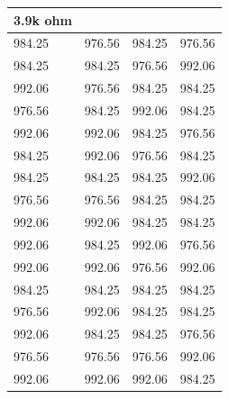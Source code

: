 	\begin{table}[]
		\centering
		\begin{tabular}{|llll|}
			\hline
			3.9k ohm                     &                             &                             &        \\ \hline
			\multicolumn{1}{|l|}{984.25} & \multicolumn{1}{l|}{976.56} & \multicolumn{1}{l|}{984.25} & 976.56 \\ \hline
			\multicolumn{1}{|l|}{984.25} & \multicolumn{1}{l|}{984.25} & \multicolumn{1}{l|}{976.56} & 992.06 \\ \hline
			\multicolumn{1}{|l|}{992.06} & \multicolumn{1}{l|}{976.56} & \multicolumn{1}{l|}{984.25} & 984.25 \\ \hline
			\multicolumn{1}{|l|}{976.56} & \multicolumn{1}{l|}{984.25} & \multicolumn{1}{l|}{992.06} & 984.25 \\ \hline
			\multicolumn{1}{|l|}{992.06} & \multicolumn{1}{l|}{992.06} & \multicolumn{1}{l|}{984.25} & 976.56 \\ \hline
			\multicolumn{1}{|l|}{984.25} & \multicolumn{1}{l|}{992.06} & \multicolumn{1}{l|}{976.56} & 984.25 \\ \hline
			\multicolumn{1}{|l|}{984.25} & \multicolumn{1}{l|}{984.25} & \multicolumn{1}{l|}{984.25} & 992.06 \\ \hline
			\multicolumn{1}{|l|}{976.56} & \multicolumn{1}{l|}{976.56} & \multicolumn{1}{l|}{984.25} & 984.25 \\ \hline
			\multicolumn{1}{|l|}{992.06} & \multicolumn{1}{l|}{992.06} & \multicolumn{1}{l|}{984.25} & 984.25 \\ \hline
			\multicolumn{1}{|l|}{992.06} & \multicolumn{1}{l|}{984.25} & \multicolumn{1}{l|}{992.06} & 976.56 \\ \hline
			\multicolumn{1}{|l|}{992.06} & \multicolumn{1}{l|}{992.06} & \multicolumn{1}{l|}{976.56} & 992.06 \\ \hline
			\multicolumn{1}{|l|}{984.25} & \multicolumn{1}{l|}{984.25} & \multicolumn{1}{l|}{984.25} & 984.25 \\ \hline
			\multicolumn{1}{|l|}{976.56} & \multicolumn{1}{l|}{992.06} & \multicolumn{1}{l|}{984.25} & 984.25 \\ \hline
			\multicolumn{1}{|l|}{992.06} & \multicolumn{1}{l|}{984.25} & \multicolumn{1}{l|}{984.25} & 976.56 \\ \hline
			\multicolumn{1}{|l|}{976.56} & \multicolumn{1}{l|}{976.56} & \multicolumn{1}{l|}{976.56} & 992.06 \\ \hline
			\multicolumn{1}{|l|}{992.06} & \multicolumn{1}{l|}{992.06} & \multicolumn{1}{l|}{992.06} & 984.25 \\ \hline

\end{tabular}
\end{table}

